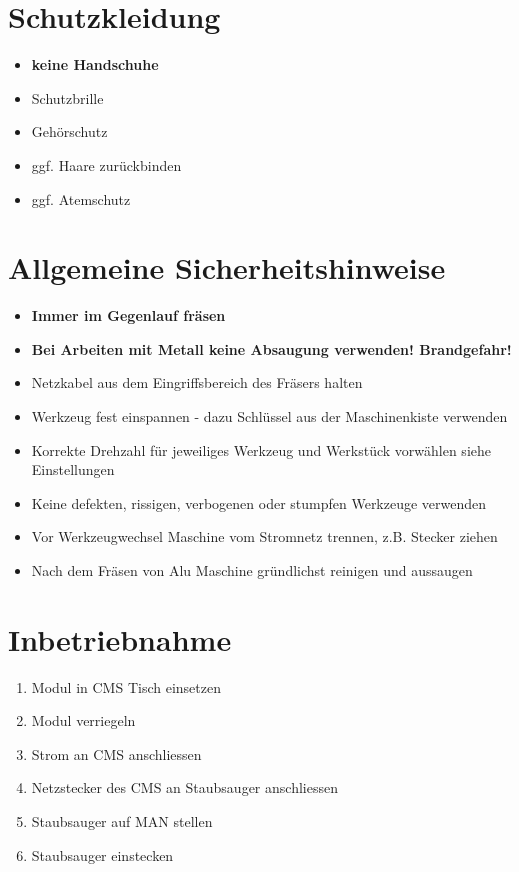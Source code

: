 \documentclass[10pt]{article}
\date{\vspace{-5ex}}
\title{\flushleft{FESTOOL Tischfr\"ase TF 1400}}
\begin{document}
\maketitle
\thispagestyle{fancy}
\section{Schutzkleidung}
\begin{itemize}
\item \textbf{keine Handschuhe}
\item Schutzbrille
\item Gehörschutz
\item ggf. Haare zurückbinden 
\item ggf. Atemschutz 
\end{itemize}
\section{Allgemeine Sicherheitshinweise}
\begin{itemize}
\item \textbf{Immer im Gegenlauf fräsen}
\item \textbf{Bei Arbeiten mit Metall keine Absaugung verwenden! Brandgefahr!}
\item Netzkabel aus dem Eingriffsbereich des Fräsers halten
\item Werkzeug fest einspannen - dazu Schlüssel aus der Maschinenkiste verwenden
\item Korrekte Drehzahl für jeweiliges Werkzeug und Werkstück vorwählen siehe Einstellungen 
\item Keine defekten, rissigen, verbogenen oder stumpfen Werkzeuge verwenden
\item Vor Werkzeugwechsel Maschine vom Stromnetz trennen, z.B. Stecker ziehen
\item Nach dem Fräsen von Alu Maschine gründlichst reinigen und aussaugen
\end{itemize}

\section{Inbetriebnahme}
\begin{enumerate}
\item Modul in CMS Tisch einsetzen
\item Modul verriegeln
\item Strom an CMS anschliessen
\item Netzstecker des CMS an Staubsauger anschliessen
\item Staubsauger auf MAN stellen
\item Staubsauger einstecken
\end{enumerate}
\end{document}
